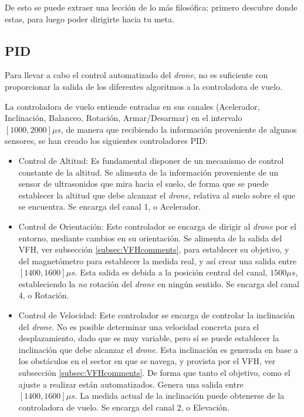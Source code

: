 De esto se puede extraer una lección de lo más filosófica: primero descubre donde estas, para luego poder dirigirte hacia tu meta.


\subsection{PID}
\label{subsec:PIDcomments}
Para llevar a cabo el control automatizado del \emph{drone}, no es suficiente con proporcionar la salida de los diferentes algoritmos a la controladora de vuelo. 

La controladora de vuelo entiende entradas en sus canales (Acelerador, Inclinación, Balanceo, Rotación, Armar/Desarmar) en el intervalo $[1000, 2000]\mu s$, de manera que recibiendo la información proveniente de algunos sensores, se han creado los siguientes controladores PID: 

\begin{itemize}
\item Control de Altitud: Es fundamental disponer de un mecanismo de control constante de la altitud. Se alimenta de la información proveniente de un sensor de ultrasonidos que mira hacia el suelo, de forma que se puede establecer la altitud que debe alcanzar el \emph{drone}, relativa al suelo sobre el que se encuentra. Se encarga del canal 1, o Acelerador.
\item Control de Orientación: Este controlador se encarga de dirigir al \emph{drone} por el entorno, mediante cambios en su orientación. Se alimenta de la salida del VFH, ver subsección \ref{subsec:VFHcomments}, para establecer su objetivo, y del magnetómetro para establecer la medida real, y así crear una salida entre $[1400, 1600]\mu s$.
Esta salida es debida a la posición central del canal, $1500\mu s$, estableciendo la \emph{no} rotación del \emph{drone} en ningún sentido. Se encarga del canal 4, o Rotación.
\item Control de Velocidad: Este controlador se encarga de controlar la inclinación del \emph{drone}. No es posible determinar una velocidad concreta para el desplazamiento, dado que es muy variable, pero sí se puede establecer la inclinación que debe alcanzar el \emph{drone}. Esta inclinación es generada en base a los obstáculos en el sector en que se navega, y provista por el VFH, ver subsección \ref{subsec:VFHcomments}. De forma que tanto el objetivo, como el ajuste a realizar están automatizados. Genera una salida entre $[1400, 1600]\mu s$. La medida actual de la inclinación puede obtenerse de la controladora de vuelo. Se encarga del canal 2, o Elevación.
\end{itemize}


